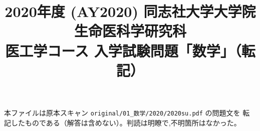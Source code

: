 \documentclass[11pt,a4paper]{article}
\title{2020年度 (AY2020) 同志社大学大学院 生命医科学研究科\\
医工学コース 入学試験問題「数学」（転記）}
\author{}
\date{}
\begin{document}
\maketitle
\vspace{-3em}

\begin{rem}
本ファイルは原本スキャン \texttt{original/01\_数学/2020/2020su.pdf} の問題文を
転記したものである（解答は含めない）。判読は明瞭で,不明箇所はなかった。
\end{rem}

\bigskip

\bigskip

\bigskip

\bigskip

\end{document}
